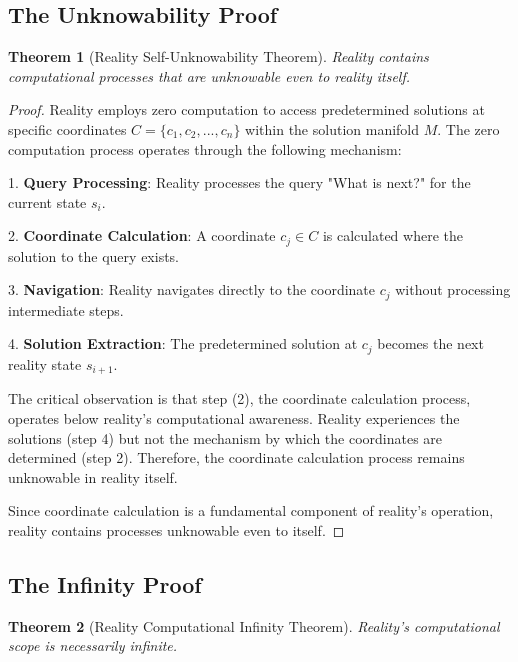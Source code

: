 \documentclass[12pt,a4paper]{article}
\newtheorem{theorem}{Theorem}[section]
\begin{document}
\subsection{The Unknowability Proof}

\begin{theorem}[Reality Self-Unknowability Theorem]
Reality contains computational processes that are unknowable even to reality itself.
\end{theorem}

\begin{proof}
Reality employs zero computation to access predetermined solutions at specific coordinates $C = \{c_1, c_2, ..., c_n\}$ within the solution manifold $M$. The zero computation process operates through the following mechanism:

1. \textbf{Query Processing}: Reality processes the query "What is next?" for the current state $s_i$.

2. \textbf{Coordinate Calculation}: A coordinate $c_j \in C$ is calculated where the solution to the query exists.

3. \textbf{Navigation}: Reality navigates directly to the coordinate $c_j$ without processing intermediate steps.

4. \textbf{Solution Extraction}: The predetermined solution at $c_j$ becomes the next reality state $s_{i+1}$.

The critical observation is that step (2), the coordinate calculation process, operates below reality's computational awareness. Reality experiences the solutions (step 4) but not the mechanism by which the coordinates are determined (step 2). Therefore, the coordinate calculation process remains unknowable in reality itself.

Since coordinate calculation is a fundamental component of reality's operation, reality contains processes unknowable even to itself.
\end{proof}

\subsection{The Infinity Proof}

\begin{theorem}[Reality Computational Infinity Theorem]
Reality's computational scope is necessarily infinite.
\end{theorem}
\end{document}
